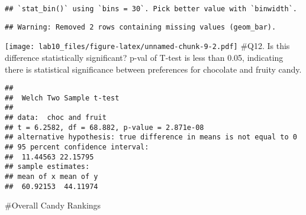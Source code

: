\documentclass[
]{article}
\newenvironment{Shaded}{\begin{snugshade}}{\end{snugshade}}
\newcommand{\DataTypeTok}[1]{\textcolor[rgb]{0.13,0.29,0.53}{#1}}
\newcommand{\DecValTok}[1]{\textcolor[rgb]{0.00,0.00,0.81}{#1}}
\newcommand{\KeywordTok}[1]{\textcolor[rgb]{0.13,0.29,0.53}{\textbf{#1}}}
\newcommand{\NormalTok}[1]{#1}
\newcommand{\OperatorTok}[1]{\textcolor[rgb]{0.81,0.36,0.00}{\textbf{#1}}}
\newcommand{\StringTok}[1]{\textcolor[rgb]{0.31,0.60,0.02}{#1}}
\begin{document}
\begin{Shaded}
\end{Shaded}

\begin{verbatim}
## `stat_bin()` using `bins = 30`. Pick better value with `binwidth`.
\end{verbatim}

\begin{verbatim}
## Warning: Removed 2 rows containing missing values (geom_bar).
\end{verbatim}

\texttt{[image: lab10\_files/figure-latex/unnamed-chunk-9-2.pdf]} \#Q12.
Is this difference statistically significant? p-val of T-test is less
than 0.05, indicating there is statistical significance between
preferences for chocolate and fruity candy.

\begin{Shaded}
\end{Shaded}

\begin{verbatim}
## 
##  Welch Two Sample t-test
## 
## data:  choc and fruit
## t = 6.2582, df = 68.882, p-value = 2.871e-08
## alternative hypothesis: true difference in means is not equal to 0
## 95 percent confidence interval:
##  11.44563 22.15795
## sample estimates:
## mean of x mean of y 
##  60.92153  44.11974
\end{verbatim}

\#Overall Candy Rankings
\end{document}
